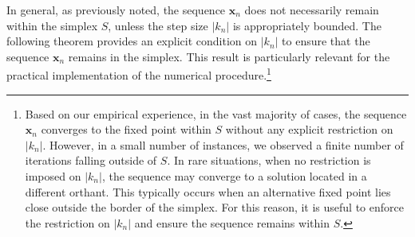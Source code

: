 \documentclass[preprint,11pt,authoryear]{elsarticle}
\begin{document}
In general, as previously noted, the sequence ${\mathbf{x}_n}$ does not necessarily remain within the simplex $S$, unless the step size $|k_n|$ is appropriately bounded. The following theorem provides an explicit condition on $|k_n|$ to ensure that the sequence ${\mathbf{x}_n}$ remains in the simplex. This result is particularly relevant for the practical implementation of the numerical procedure.\footnote{Based on our empirical experience, in the vast majority of cases, the sequence ${\mathbf{x}_n}$ converges to the fixed point within $S$ without any explicit restriction on $|k_n|$. However, in a small number of instances, we observed a finite number of iterations falling outside of $S$. In rare situations, when no restriction is imposed on $|k_n|$, the sequence may converge to a solution located in a different orthant. This typically occurs when an alternative fixed point lies close outside the border of the simplex. For this reason, it is useful to enforce the restriction on $|k_n|$ and ensure the sequence remains within $S$.}
\end{document}
